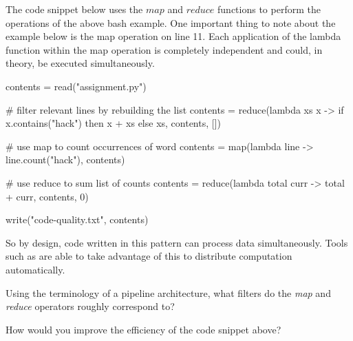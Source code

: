 \documentclass{csse4400}
\begin{document}
The code snippet below uses the $map$ and $reduce$ functions
to perform the operations of the above bash example.
One important thing to note about the example below is the map operation on line 11.
Each application of the lambda function within the map operation is completely independent and could,
in theory, be executed simultaneously. 

\begin{code}[language=python,literate={{->}{{$\to$}}{2}{lambda}{{$\lambda$}}{1}},morekeywords={then}]{}
contents = read("assignment.py")

# filter relevant lines by rebuilding the list
contents = reduce(lambda xs x -> 
                      if x.contains("hack")
                        then x + xs
                        else xs,
                    contents,
                    [])

# use map to count occurrences of word
contents = map(lambda line -> line.count("hack"), contents)

# use reduce to sum list of counts
contents = reduce(lambda total curr -> total + curr, contents, 0)

write("code-quality.txt", contents)
\end{code}

So by design, code written in this pattern can process data simultaneously.
Tools such as  are able to take advantage of this to distribute computation automatically.

\begin{extra}
Using the terminology of a pipeline architecture, what filters do the \textsl{map} and \textsl{reduce} operators roughly correspond to?
\end{extra}

\begin{extra}
How would you improve the efficiency of the code snippet above?
\end{extra}



\end{document}
